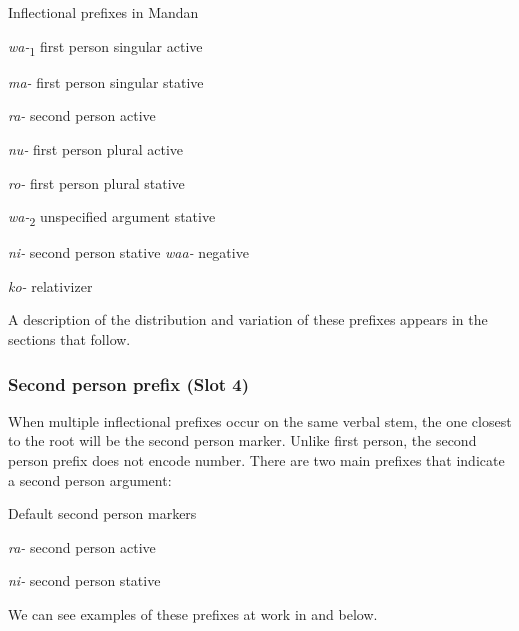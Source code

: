\begin{exe}
\item\label{mandaninflectionalprefixes} Inflectional prefixes in Mandan

	\begin{xlist}
	\item \textit{wa-}\textsubscript{1} first person singular active
        \item \textit{ma-} first person singular stative
        \item \textit{ra-} second person active
        \item \textit{nu-} first person plural active
        \item \textit{ro-} first person plural stative
        \item \textit{wa-}\textsubscript{2} unspecified argument stative
        \item \textit{ni-} second person stative 
        \textit{waa-}	negative
	\item \textit{ko-} relativizer
	\end{xlist}
\end{exe}

A description of the distribution and variation of these prefixes appears in the sections that follow.

\subsubsection{Second person prefix (Slot 4)}\label{SubsubSecondPerson}

When multiple inflectional prefixes occur on the same verbal stem, the one closest to the root will be the second person marker. Unlike first person, the second person prefix does not encode number. There are two main prefixes that indicate a second person argument:

\begin{exe}
\item\label{secondpersonmain} Default second person markers

\begin{xlist}
    \item \textit{ra-} second person active
    
    \item \textit{ni-} second person stative
\end{xlist}

\end{exe}

We can see examples of these prefixes at work in  and  below.

